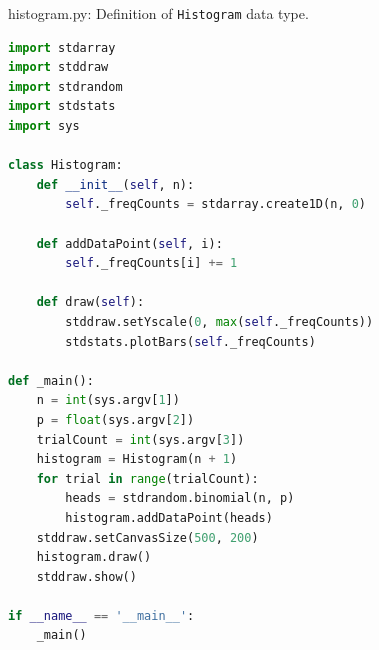 \documentclass[8pt,a4paper,compress]{beamer}
\begin{document}
\begin{frame}[fragile]
\pause

\begin{framed}
\tiny histogram.py: Definition of \lstinline{Histogram} data type.
\end{framed}

\begin{lstlisting}[language=Python]
import stdarray
import stddraw
import stdrandom
import stdstats
import sys

class Histogram:
    def __init__(self, n):
        self._freqCounts = stdarray.create1D(n, 0)

    def addDataPoint(self, i):
        self._freqCounts[i] += 1

    def draw(self):
        stddraw.setYscale(0, max(self._freqCounts))
        stdstats.plotBars(self._freqCounts)

def _main():
    n = int(sys.argv[1]) 
    p = float(sys.argv[2])
    trialCount = int(sys.argv[3]) 
    histogram = Histogram(n + 1)
    for trial in range(trialCount):
        heads = stdrandom.binomial(n, p)
        histogram.addDataPoint(heads)
    stddraw.setCanvasSize(500, 200)
    histogram.draw()
    stddraw.show()

if __name__ == '__main__':
    _main()
\end{lstlisting}
\end{frame}
\end{document}
